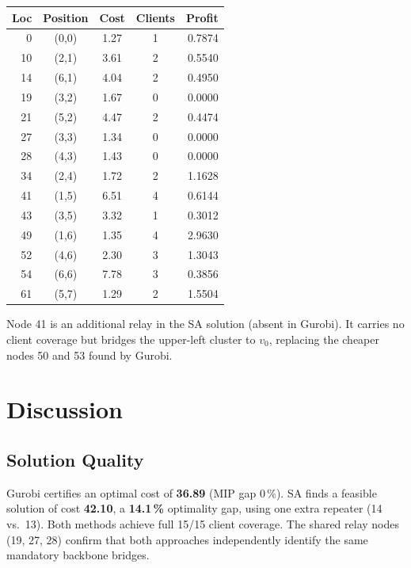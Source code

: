 \documentclass[10pt,a4paper,twocolumn]{article}
\begin{document}
\begin{center}
\renewcommand{\arraystretch}{1.15}
\fontsize{7pt}{8.5pt}\selectfont
\begin{tabular}{@{}rcccr@{}}
\toprule
\textbf{Loc} & \textbf{Position} & \textbf{Cost} &
\textbf{Clients} & \textbf{Profit} \\
\midrule
 0  & (0,0) & 1.27 & 1  & 0.7874 \\
10  & (2,1) & 3.61 & 2  & 0.5540 \\
14  & (6,1) & 4.04 & 2  & 0.4950 \\
19  & (3,2) & 1.67 & 0  & 0.0000 \\
21  & (5,2) & 4.47 & 2  & 0.4474 \\
27  & (3,3) & 1.34 & 0  & 0.0000 \\
28  & (4,3) & 1.43 & 0  & 0.0000 \\
34  & (2,4) & 1.72 & 2  & 1.1628 \\
41  & (1,5) & 6.51 & 4  & 0.6144 \\
43  & (3,5) & 3.32 & 1  & 0.3012 \\
49  & (1,6) & 1.35 & 4  & 2.9630 \\
52  & (4,6) & 2.30 & 3  & 1.3043 \\
54  & (6,6) & 7.78 & 3  & 0.3856 \\
61  & (5,7) & 1.29 & 2  & 1.5504 \\
\bottomrule
\end{tabular}
\end{center}

\noindent Node 41 is an additional relay in the SA solution (absent in
Gurobi). It carries no client coverage but bridges the upper-left
cluster to $v_0$, replacing the cheaper nodes 50 and 53 found by Gurobi.

\section{Discussion}

\subsection{Solution Quality}

Gurobi certifies an optimal cost of \textbf{36.89} (MIP gap 0\,\%).
SA finds a feasible solution of cost \textbf{42.10}, a
\textbf{14.1\,\%} optimality gap, using one extra repeater (14
vs.\ 13).  Both methods achieve full 15/15 client coverage.
The shared relay nodes (19, 27, 28) confirm that both approaches
independently identify the same mandatory backbone bridges.
\end{document}
